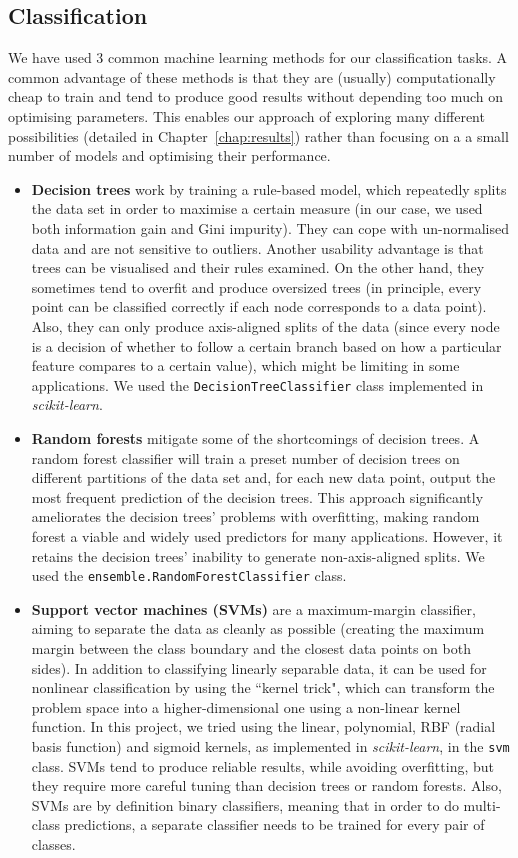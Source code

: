 \documentclass[bsc,frontabs,deptreport,singlespacing,parskip, twoside]{infthesis}
\begin{document}
\subsection{Classification}
We have used 3 common machine learning methods for our classification tasks. A common advantage of these methods is that they are (usually) computationally cheap to train and tend to produce good results without depending too much on optimising parameters. This enables our approach of exploring many different possibilities (detailed in Chapter~\ref{chap:results}) rather than focusing on a a small number of models and optimising their performance.
\begin{itemize}
	\item \textbf{Decision trees} work by training a rule-based model, which repeatedly splits the data set in order to maximise a certain measure (in our case, we used both information gain and Gini impurity). They can cope with un-normalised data and are not sensitive to outliers. Another usability advantage is that trees can be visualised and their rules examined. On the other hand, they sometimes tend to overfit and produce oversized trees (in principle, every point can be classified correctly if each node corresponds to a data point). Also, they can only produce axis-aligned splits of the data (since every node is a decision of whether to follow a certain branch based on how a particular feature compares to a certain value), which might be limiting in some applications. We used the \texttt{DecisionTreeClassifier} class implemented in \textit{scikit-learn}.
	\item \textbf{Random forests} \cite{breiman2001random} mitigate some of the shortcomings of decision trees. A random forest classifier will train a preset number of decision trees on different partitions of the data set and, for each new data point, output the most frequent prediction of the decision trees. This approach significantly ameliorates the decision trees' problems with overfitting, making random forest a viable and widely used predictors for many applications. However, it retains the decision trees' inability to generate non-axis-aligned splits. We used the \texttt{ensemble.RandomForestClassifier} class.
	\item \textbf{Support vector machines (SVMs)} \cite{cortes1995support} are a maximum-margin classifier, aiming to separate the data as cleanly as possible (creating the maximum margin between the class boundary and the closest data points on both sides). In addition to classifying linearly separable data, it can be used for nonlinear classification by using the ``kernel trick", which can transform the problem space into a higher-dimensional one using a non-linear kernel function. In this project, we tried using the linear, polynomial, RBF (radial basis function) and sigmoid kernels, as implemented in \textit{scikit-learn}, in the \texttt{svm} class. SVMs tend to produce reliable results, while avoiding overfitting, but they require more careful tuning than decision trees or random forests. Also, SVMs are by definition binary classifiers, meaning that in order to do multi-class predictions, a separate classifier needs to be trained for every pair of classes.
\end{itemize}
\end{document}
